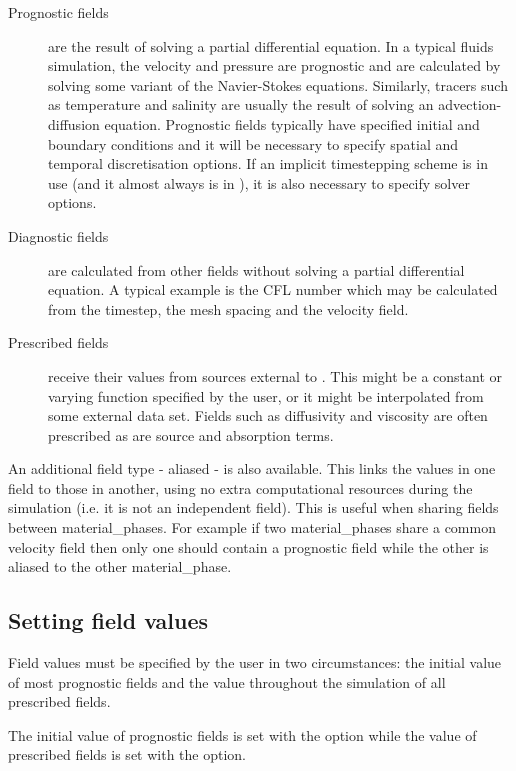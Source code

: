 \begin{description}
\item[Prognostic fields] are the result of solving a partial differential
  equation. In a typical fluids simulation, the velocity and pressure are
  prognostic and are calculated by solving some variant of the Navier-Stokes
  equations. Similarly, tracers such as temperature and salinity are usually
  the result of solving an advection-diffusion equation. Prognostic fields
  typically have specified initial and boundary conditions and it will be
  necessary to specify spatial and temporal discretisation options. If an
  implicit timestepping scheme is in use (and it almost always is in
  \fluidity), it is also necessary to specify solver options. 
\item[Diagnostic fields] are calculated from other fields without solving a
  partial differential equation. A typical example is the CFL number which
  may be calculated from the timestep, the mesh spacing and the velocity
  field. 
\item[Prescribed fields] receive their values from sources external to
  \fluidity. This might be a constant or varying function specified by the
  user, or it might be interpolated from some external data set. Fields such
  as diffusivity and viscosity are often prescribed as are source and
  absorption terms.
\end{description}

An additional field type - aliased - is also available.  This links the values in one field to those in another, using no extra computational resources during the simulation (i.e. it is not an independent field).  This is useful when sharing fields between material\_phases.  For example if two material\_phases share a common velocity field then only one should contain a prognostic field while the other is aliased to the other material\_phase.

\subsection{Setting field values}\label{sec:setting_field_values}
Field values must be specified by the user in two circumstances: the initial
value of most prognostic fields and the value throughout the simulation of
all prescribed fields. 

The initial value of prognostic fields is set with the
 option while the value of
prescribed fields is set with the  option.


